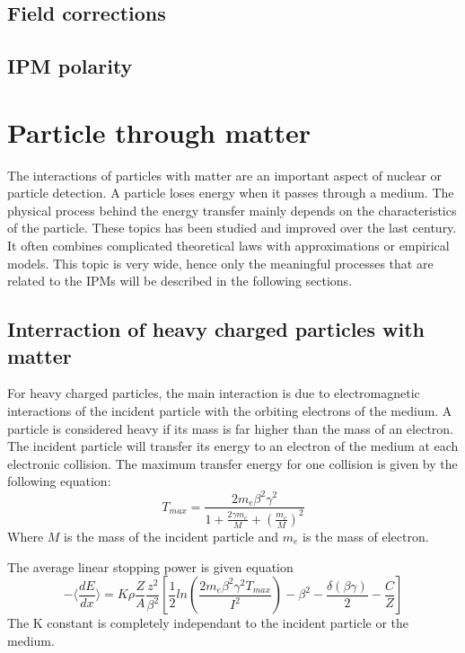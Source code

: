 \begin{refsection}
	\subsection{Field corrections}
	\subsection{IPM polarity}
	\section{Particle through matter}
	The interactions of particles with matter are an important aspect of nuclear or particle detection\cite[]{Leo1994, Knoll2010}.
	A particle loses energy when it passes through a medium.
	The physical process behind the energy transfer mainly depends on the characteristics of the particle.
	These topics has been studied and improved over the last century.
	It often combines complicated theoretical laws with approximations or empirical models.
	This topic is very wide, hence only the meaningful processes that are related to the IPMs will be described in the following sections.

	\subsection{Interraction of heavy charged particles with matter}
	For heavy charged particles, the main interaction is due to electromagnetic interactions of the incident particle with the orbiting electrons of the medium.
	A particle is considered heavy if its mass is far higher than the mass of an electron.
	The incident particle will transfer its energy to an electron of the medium at each electronic collision.
	The maximum transfer energy for one collision is given by the following equation:
	\begin{equation}
		T_{max} = \frac{2 m_{e} \beta^{2} \gamma^{2}}{1 + \frac{2 \gamma m_{e} }{M} + \left( \frac{m_{e}}{M} \right)^{2}}
	\end{equation}
	Where \(M\) is the mass of the incident particle and \(m_{e}\) is the mass of electron.

	The average linear stopping power is given equation\cite[]{Bethe1930} \cite[p. 446]{Tanabashi2018}
	\begin{equation}
		- \bigg \langle \frac{dE}{dx} \bigg \rangle =K \rho \frac{Z}{A} \frac{z^{2}}{\beta^{2}} \left[\frac{1}{2} ln \left(\frac{2 m_{e} \beta^{2} \gamma^{2} T_{max}}{I^{2}} \right) - \beta^{2} - \frac{\delta(\beta \gamma)}{2} - \frac{C}{Z} \right]
	\end{equation}
	The K constant is completely independant to the incident particle or the medium.


\end{refsection}
